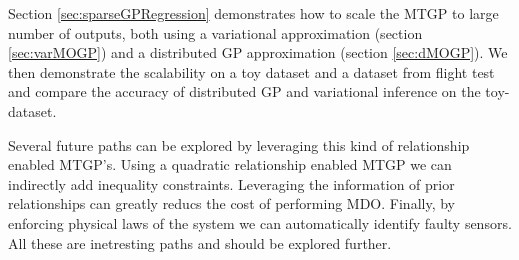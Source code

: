 Section \ref{sec:sparseGPRegression} demonstrates how to scale the MTGP to large number of outputs, both using a variational approximation (section \ref{sec:varMOGP}) and a distributed GP approximation (section \ref{sec:dMOGP}). We then demonstrate the scalability on a toy dataset and a dataset from flight test and compare the accuracy of distributed GP and variational inference on the toy-dataset. 

Several future paths can be explored by leveraging this kind of relationship enabled MTGP's. Using a quadratic relationship enabled MTGP we can indirectly add inequality constraints. Leveraging the information of prior relationships can greatly reducs the cost of performing MDO. Finally, by enforcing physical laws of the system we can automatically identify faulty sensors. All these are inetresting paths and should be explored further. 


